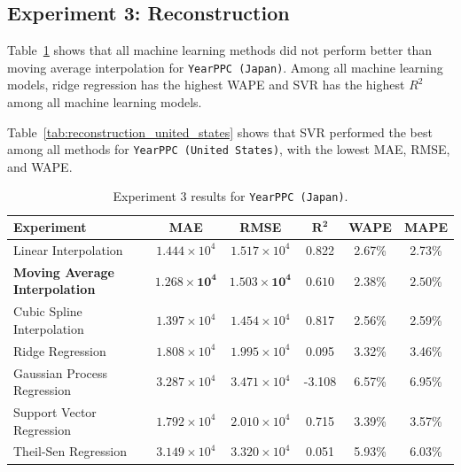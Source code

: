 \subsection{Experiment 3: Reconstruction}

Table~\ref{tab:reconstruction_japan} shows that all machine learning methods did not perform better than moving average interpolation for \texttt{YearPPC (Japan)}. Among all machine learning models, ridge regression has the highest WAPE and SVR has the highest \(R^2\) among all machine learning models.

Table~\ref{tab:reconstruction_united_states} shows that SVR performed the best among all methods for \texttt{YearPPC (United States)}, with the lowest MAE, RMSE, and WAPE.

\begin{table}[!ht]
	\centering
	\caption{\centering Experiment 3 results for \texttt{YearPPC (Japan)}.}
	\begin{tabular}{@{}lccccc@{}}
		\toprule
		\textbf{Experiment}         & \textbf{MAE}                   & \textbf{RMSE}         & $\mathbf{R^2}$ & \textbf{WAPE} & \textbf{MAPE} \\
		\midrule
		Linear Interpolation        & \(1.444 \times 10^4\)          & \(1.517 \times 10^4\) & 0.822          & 2.67\%        & 2.73\%        \\
		\textbf{Moving Average Interpolation}
		                            & \(\mathbf{1.268 \times 10^4}\)
		                            & \(\mathbf{1.503 \times 10^4}\)
		                            & \(\mathbf{0.610}\)
		                            & \(\mathbf{2.38}\)\%
		                            & \(\mathbf{2.50}\)\%                                                                                     \\
		Cubic Spline Interpolation  & \(1.397 \times 10^4\)          & \(1.454 \times 10^4\) & 0.817          & 2.56\%        & 2.59\%        \\
		Ridge Regression            & \(1.808 \times 10^4\)          & \(1.995 \times 10^4\) & 0.095          & 3.32\%        & 3.46\%        \\
		Gaussian Process Regression & \(3.287 \times 10^4\)          & \(3.471 \times 10^4\) & -3.108         & 6.57\%        & 6.95\%        \\
		Support Vector Regression   & \(1.792 \times 10^4\)          & \(2.010 \times 10^4\) & 0.715          & 3.39\%        & 3.57\%        \\
		Theil-Sen Regression        & \(3.149 \times 10^4\)          & \(3.320 \times 10^4\) & 0.051          & 5.93\%        & 6.03\%        \\
		\hline
	\end{tabular}
	\label{tab:reconstruction_japan}
\end{table}

